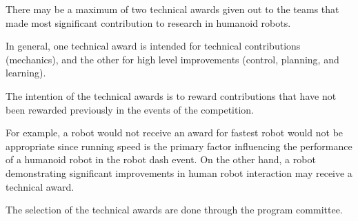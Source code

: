 \documentclass[12pt]{hurocup}
\begin{document}

\begin{lawlist}[ORG]
  
\item There may be a maximum of two technical awards given out to the
  teams that made most significant contribution to research in
  humanoid robots. 
  
\item In general, one technical award is intended for technical
  contributions (mechanics), and the other for high level improvements
  (control, planning, and learning).
  
\item The intention of the technical awards is to reward contributions
  that have not been rewarded previously in the events of the
  competition. 
  
  For example, a robot would not receive an award for fastest robot
  would not be appropriate since running speed is the primary factor
  influencing the performance of a humanoid robot in the robot dash
  event. On the other hand, a robot demonstrating significant
  improvements in human robot interaction may receive a technical
  award.

\item The selection of the technical awards are done through the
  program committee.

\end{lawlist}
\end{document}
